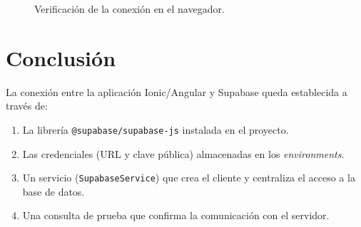 \documentclass[11pt,a4paper]{article}
\begin{document}
\begin{figure}[H]
  \centering
  \caption{Verificación de la conexión en el navegador.}
  \label{fig:verificacion}
\end{figure}

\section{Conclusión}

La conexión entre la aplicación Ionic/Angular y Supabase queda establecida a
través de:
\begin{enumerate}
  \item La librería \texttt{@supabase/supabase-js} instalada en el proyecto.
  \item Las credenciales (URL y clave pública) almacenadas en los
        \textit{environments}.
  \item Un servicio (\texttt{SupabaseService}) que crea el cliente y centraliza
        el acceso a la base de datos.
  \item Una consulta de prueba que confirma la comunicación con el servidor.
\end{enumerate}
\end{document}
